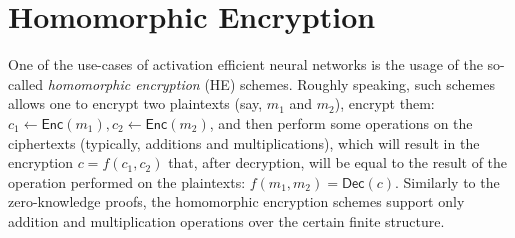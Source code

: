 \documentclass[12pt,a4paper,oneside]{book}
\theoremstyle{dplplain}
\theoremstyle{dpldefinition}
\theoremstyle{dplremark}
\newtheorem{example}[theorem]{Приклад}%
\begin{document}



\section{Homomorphic Encryption}

One of the use-cases of activation efficient neural networks is the usage of the
so-called \textit{homomorphic encryption} (HE) schemes. Roughly speaking, such
schemes allows one to encrypt two plaintexts (say, $m_1$ and $m_2$), encrypt
them: $c_1 \gets \mathsf{Enc}(m_1), c_2 \gets \mathsf{Enc}(m_2)$, and then
perform some operations on the ciphertexts (typically, additions and
multiplications), which will result in the encryption $c=f(c_1,c_2)$ that, after
decryption, will be equal to the result of the operation performed on the
plaintexts: $f(m_1,m_2) = \mathsf{Dec}(c)$. Similarly to the zero-knowledge
proofs, the homomorphic encryption schemes support only addition and 
multiplication operations over the certain finite structure.
\end{document}
